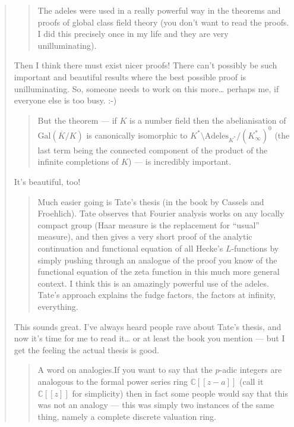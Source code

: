 \documentclass{article}
\begin{document}
\begin{quote}
\begin{quote}
The adeles were used in a really powerful way in the theorems and proofs
of global class field theory (you don't want to read the proofs. I did
this precisely once in my life and they are very unilluminating).
\end{quote}

Then I think there must exist nicer proofs! There can't possibly be such
important and beautiful results where the best possible proof is
unilluminating. So, someone needs to work on this more\ldots{} perhaps
me, if everyone else is too busy. :-)

\begin{quote}
But the theorem --- if \(K\) is a number field then the abelianisation
of \(\mathrm{Gal}(\overline{K}/K)\) is canonically isomorphic to
\(K^*\setminus\mathrm{Adeles}_{K^*}/(K_\infty^*)^0\) (the last term
being the connected component of the product of the infinite completions
of \(K\)) --- is incredibly important.
\end{quote}

It's beautiful, too!

\begin{quote}
Much easier going is Tate's thesis (in the book by Cassels and
Froehlich). Tate observes that Fourier analysis works on any locally
compact group (Haar measure is the replacement for ``usual'' measure),
and then gives a very short proof of the analytic continuation and
functional equation of all Hecke's \(L\)-functions by simply pushing
through an analogue of the proof you know of the functional equation of
the zeta function in this much more general context. I think this is an
amazingly powerful use of the adeles. Tate's approach explains the fudge
factors, the factors at infinity, everything.
\end{quote}

This sounds great. I've always heard people rave about Tate's thesis,
and now it's time for me to read it\ldots{} or at least the book you
mention --- but I get the feeling the actual thesis is good.

\begin{quote}
A word on analogies.If you want to say that the \(p\)-adic integers are
analogous to the formal power series ring \(\mathbb{C}[[z-a]]\) (call it
\(\mathbb{C}[[z]]\) for simplicity) then in fact some people would say
that this was not an analogy --- this was simply two instances of the
same thing, namely a complete discrete valuation ring.
\end{quote}


\end{quote}
\end{document}

